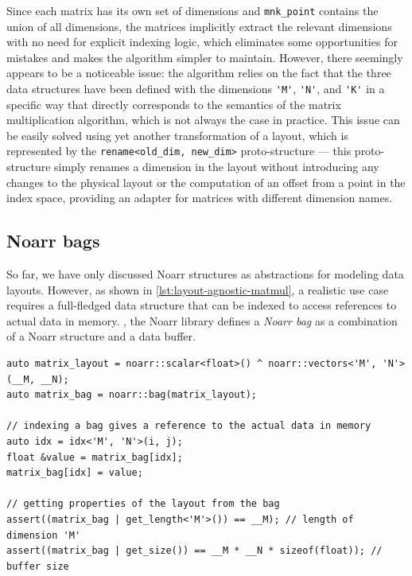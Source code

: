 Since each matrix has its own set of dimensions and \lstinline{mnk_point} contains the union of all dimensions, the matrices implicitly extract the relevant dimensions with no need for explicit indexing logic, which eliminates some opportunities for mistakes and makes the algorithm simpler to maintain. However, there seemingly appears to be a noticeable issue: the algorithm relies on the fact that the three data structures have been defined with the dimensions \lstinline{'M'}, \lstinline{'N'}, and \lstinline{'K'} in a specific way that directly corresponds to the semantics of the matrix multiplication algorithm, which is not always the case in practice. This issue can be easily solved using yet another transformation of a layout, which is represented by the \lstinline{rename<old_dim, new_dim>} proto-structure --- this proto-structure simply renames a dimension in the layout without introducing any changes to the physical layout or the computation of an offset from a point in the index space, providing an adapter for matrices with different dimension names.


\subsection{Noarr bags}\label{sec:noarr-bags}

So far, we have only discussed Noarr structures as abstractions for modeling data layouts. However, as shown in \cref{lst:layout-agnostic-matmul}, a realistic use case requires a full-fledged data structure that can be indexed to access references to actual data in memory. , the Noarr library defines a \emph{Noarr bag} as a combination of a Noarr structure and a data buffer.

\begin{lstlisting}[style=C++, caption={Defining a simple bag from a Noarr structure}, label={lst:simple-noarr-bag}, basicstyle=\ttfamily\scriptsize]
auto matrix_layout = noarr::scalar<float>() ^ noarr::vectors<'M', 'N'>(__M, __N);
auto matrix_bag = noarr::bag(matrix_layout);

// indexing a bag gives a reference to the actual data in memory
auto idx = idx<'M', 'N'>(i, j);
float &value = matrix_bag[idx];
matrix_bag[idx] = value;

// getting properties of the layout from the bag
assert((matrix_bag | get_length<'M'>()) == __M); // length of dimension 'M'
assert((matrix_bag | get_size()) == __M * __N * sizeof(float)); // buffer size
\end{lstlisting}

